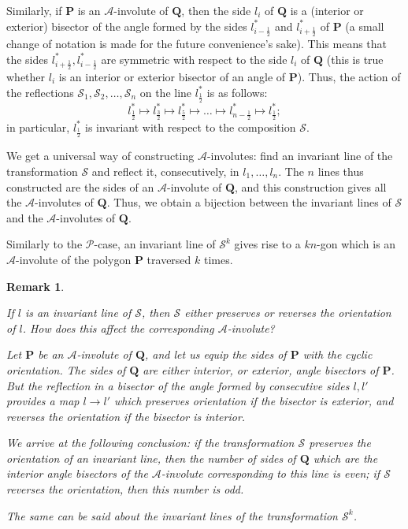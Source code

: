 \documentclass[12pt]{article}
\newtheorem{remark}[lemma]{Remark}
\newcommand{\Pev}{\mathcal{P}}
\newcommand{\Aev}{\mathcal{A}}
\renewcommand{\P}{\mathbf{P}}
\begin{document}
Similarly, if $\P$ is an $\Aev$-involute of $\mathbf Q$, then the side $l_i$ of $\mathbf Q$ is a (interior or exterior) bisector of the angle formed by the sides $l^\ast_{i-\frac12}$ and $l^\ast_{i+\frac12}$ of $\P$ (a small change of notation is made for the future convenience's sake). This means that the sides $l^\ast_{i+\frac12},l^\ast_{i-\frac12}$ are symmetric  with respect to the side $l_i$ of $\mathbf Q$ (this is true whether $l_i$ is an interior or exterior bisector of an angle of $\P$). Thus, the action of the reflections ${\mathcal S}_1,{\mathcal S}_2,\dots,{\mathcal S}_n$ on the line $l^\ast_{\frac12}$ is as follows: $$l^\ast_{\frac12}\mapsto l^\ast_{\frac32}\mapsto l^\ast_{\frac52}\mapsto\dots\mapsto l^\ast_{n-\frac12}\mapsto l^\ast_{\frac12};$$in particular, $l^\ast_{\frac12}$ is invariant with respect to the composition $\mathcal S$. 

We get a universal way of constructing  $\Aev$-involutes: find an invariant line of the transformation $\mathcal S$ and reflect it, consecutively, in $l_1,\dots,l_n$. The $n$ lines thus constructed are the sides of an $\Aev$-involute of $\mathbf Q$, and this construction gives all the $\Aev$-involutes of $\mathbf Q$. Thus, we obtain a bijection between the invariant lines of $\mathcal S$ and the $\Aev$-involutes of $\mathbf Q$. 

Similarly to the $\Pev$-case, an invariant line of ${\mathcal S}^k$ gives rise to a $kn$-gon which is an $\Aev$-involute of the polygon $\P$ traversed $k$ times. 

\begin{remark}
\label{rem:EvenOdd}
{\rm
If $l$ is an invariant line of $\mathcal S$, then $\mathcal S$ either preserves or reverses the orientation of $l$. How does this affect the corresponding $\Aev$-involute? 

Let $\P$ be an $\Aev$-involute of $\mathbf Q$, and let us equip the sides of $\P$ with the cyclic orientation. The sides of $\mathbf Q$ are either interior, or exterior, angle bisectors of $\P$. But the reflection in a bisector of the angle formed by consecutive sides $l,l'$ provides a map $l\to l'$ which preserves orientation if the bisector is exterior, and reverses the orientation if the bisector is interior. 

We arrive at the following conclusion: if the transformation $\mathcal S$ preserves the orientation of an invariant line, then the number of sides of $\mathbf Q$ which are the interior angle bisectors of the $\Aev$-involute corresponding to this line is even; if $\mathcal S$ reverses the orientation, then this number is odd. 

The same can be said about the invariant lines of the transformation ${\mathcal S}^k$.
}
\end{remark}
\end{document}
